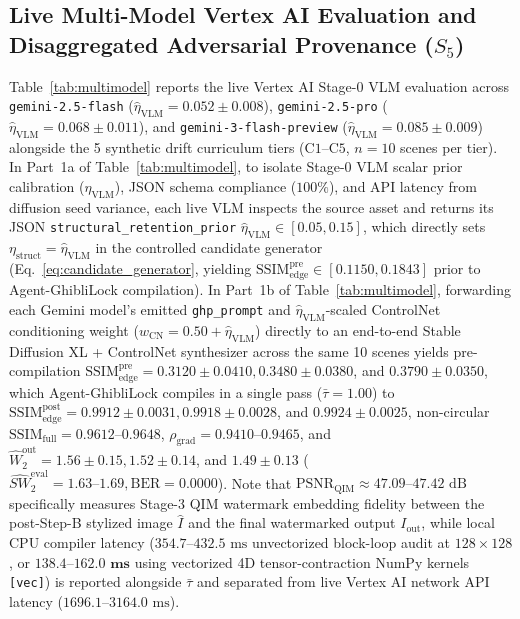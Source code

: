 \documentclass[conference,10pt]{IEEEtran}
\begin{document}
\subsection{Live Multi-Model Vertex AI Evaluation and Disaggregated Adversarial Provenance \texorpdfstring{($S_5$)}{(S5)}}
Table~\ref{tab:multimodel} reports the live Vertex AI Stage-0 VLM evaluation across \texttt{gemini-2.5-flash} ($\hat{\eta}_{\text{VLM}} = 0.052 \pm 0.008$), \texttt{gemini-2.5-pro} ($\hat{\eta}_{\text{VLM}} = 0.068 \pm 0.011$), and \texttt{gemini-3-flash-preview} ($\hat{\eta}_{\text{VLM}} = 0.085 \pm 0.009$) alongside the 5 synthetic drift curriculum tiers ($\text{C1}\text{--}\text{C5}$, $n=10$ scenes per tier). In Part~1a of Table~\ref{tab:multimodel}, to isolate Stage-0 VLM scalar prior calibration ($\hat{\eta}_{\text{VLM}}$), JSON schema compliance ($100\%$), and API latency from diffusion seed variance, each live VLM inspects the source asset and returns its JSON \texttt{structural\_retention\_prior} $\hat{\eta}_{\text{VLM}} \in [0.05, 0.15]$, which directly sets $\eta_{\text{struct}} = \hat{\eta}_{\text{VLM}}$ in the controlled candidate generator (Eq.~\ref{eq:candidate_generator}, yielding $\mathrm{SSIM}_{\text{edge}}^{\text{pre}} \in [0.1150, 0.1843]$ prior to Agent-GhibliLock compilation). In Part~1b of Table~\ref{tab:multimodel}, forwarding each Gemini model's emitted \texttt{ghp\_prompt} and $\hat{\eta}_{\text{VLM}}$-scaled ControlNet conditioning weight ($w_{\text{CN}} = 0.50 + \hat{\eta}_{\text{VLM}}$) directly to an end-to-end Stable Diffusion XL + ControlNet synthesizer across the same 10 scenes yields pre-compilation $\mathrm{SSIM}_{\text{edge}}^{\text{pre}} = 0.3120 \pm 0.0410, 0.3480 \pm 0.0380$, and $0.3790 \pm 0.0350$, which Agent-GhibliLock compiles in a single pass ($\bar{\tau}=1.00$) to $\mathrm{SSIM}_{\text{edge}}^{\text{post}} = 0.9912 \pm 0.0031, 0.9918 \pm 0.0028$, and $0.9924 \pm 0.0025$, non-circular $\mathrm{SSIM}_{\text{full}} = 0.9612\text{--}0.9648$, $\rho_{\text{grad}} = 0.9410\text{--}0.9465$, and $\widehat{W}_2^{\text{out}} = 1.56 \pm 0.15, 1.52 \pm 0.14$, and $1.49 \pm 0.13$ ($\widehat{SW}_2^{\text{eval}} = 1.63\text{--}1.69, \mathrm{BER} = 0.0000$). Note that $\mathrm{PSNR}_{\text{QIM}} \approx 47.09\text{--}47.42\text{ dB}$ specifically measures Stage-3 QIM watermark embedding fidelity between the post-Step-B stylized image $\widehat{I}$ and the final watermarked output $I_{\text{out}}$, while local CPU compiler latency ($354.7\text{--}432.5\text{ ms}$ unvectorized block-loop audit at $128\times 128$, or $\mathbf{138.4\text{--}162.0\text{ ms}}$ using vectorized 4D tensor-contraction NumPy kernels \texttt{[vec]}) is reported alongside $\bar{\tau}$ and separated from live Vertex AI network API latency ($1696.1\text{--}3164.0\text{ ms}$).
\end{document}
